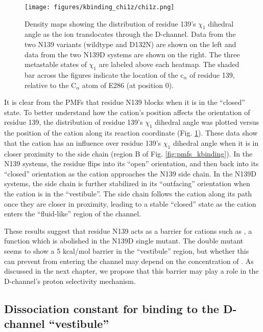\begin{figure}[htbp]
\centering
\texttt{[image: figures/kbinding\_chi1z/chi1z.png]}
\caption[Density maps showing the distribution of residue 139's $\chi_1$ dihedral angle as the  ion translocates through the D-channel.]{Density maps showing the distribution of residue 139's $\chi_1$ dihedral angle as the  ion translocates through the D-channel. Data from the two N139 variants (wildtype and D132N) are shown on the left and data from the two N139D systems are shown on the right. The three metastable states of $\chi_1$ are labeled above each heatmap. The shaded bar across the figures indicate the location of the c$_\alpha$ of residue 139, relative to the C$_\alpha$ atom of E286 (at position 0).}
\label{fig:kbinding_chi1z}
\end{figure}

It is clear from the PMFs that residue N139 blocks  when it is in the ``closed'' state. To better understand how the cation's position affects the orientation of residue 139, the distribution of residue 139's $\chi_1$ dihedral angle was plotted versus the position of the cation along its reaction coordinate (Fig. \ref{fig:kbinding_chi1z}). These data show that the cation has an influence over residue 139's $\chi_1$ dihedral angle when it is in closer proximity to the side chain (region B of Fig. \ref{fig:pmfs_kbinding}). In the N139 systems, the residue flips into its ``open'' orientation, and then back into its ``closed'' orientation as the cation approaches the N139 side chain. In the N139D systems, the side chain is further stabilized in its ``outfacing'' orientation when the cation is in the ``vestibule''. The side chain follows the cation along its path once they are closer in proximity, leading to a stable ``closed'' state as the cation enters the ``fluid-like'' region of the channel.

These results suggest that residue N139 acts as a barrier for cations such as , a function which is abolished in the N139D single mutant. The double mutant seems to show a 5 kcal/mol barrier in the ``vestibule'' region, but whether this can prevent  from entering the channel may depend on the concentration of . As discussed in the next chapter, we propose that this barrier may play a role in the D-channel's proton selectivity mechanism.

\subsection{Dissociation constant for  binding to the D-channel ``vestibule''}
\label{sec:results_dissociation_constants}

